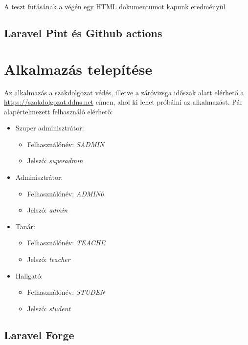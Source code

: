 \documentclass[
]{thesis-ekf}
\theoremstyle{definition}
\theoremstyle{remark}
\begin{document}


A teszt futásának a végén egy HTML dokumentumot kapunk eredményül

\section{Laravel Pint és Github actions}

\chapter{Alkalmazás telepítése}
\label{setup}
Az alkalmazás a szakdolgozat védés, illetve a záróvizsga időszak alatt elérhető a \url{https://szakdolgozat.ddns.net} címen, ahol ki lehet próbálni az alkalmazást. Pár alapértelmezett felhasználó elérhető:
\begin{itemize}
	\item Szuper adminisztrátor:
	\begin{itemize}
		\item Felhasználónév: \emph{SADMIN}
		\item Jelszó: \emph{superadmin}
	\end{itemize}
	\item Adminisztrátor:
	\begin{itemize}
		\item Felhasználónév: \emph{ADMIN0}
		\item Jelszó: \emph{admin}
	\end{itemize}
	\item Tanár:
	\begin{itemize}
		\item Felhasználónév: \emph{TEACHE}
		\item Jelszó: \emph{teacher}
	\end{itemize}
	\item Hallgató:
	\begin{itemize}
		\item Felhasználónév: \emph{STUDEN}
		\item Jelszó: \emph{student}
	\end{itemize}
\end{itemize}
\section{Laravel Forge}
\end{document}
